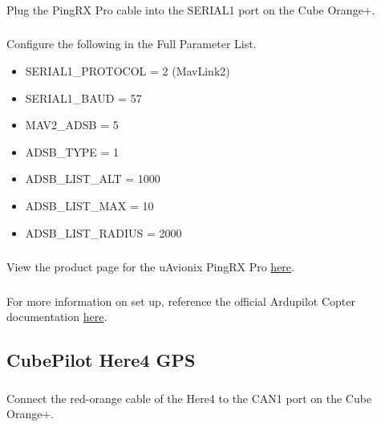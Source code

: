             \subsubsection{} Plug the PingRX Pro cable into the SERIAL1 port on the Cube Orange+.
            \subsubsection{} Configure the following in the Full Parameter List.
                \begin{itemize}
                    \item SERIAL1\_PROTOCOL = 2 (MavLink2)
                    \item SERIAL1\_BAUD = 57
                    \item MAV2\_ADSB = 5
                    \item ADSB\_TYPE = 1
                    \item ADSB\_LIST\_ALT = 1000
                    \item ADSB\_LIST\_MAX = 10
                    \item ADSB\_LIST\_RADIUS = 2000
                 \end{itemize}           
            \subsubsection{} View the product page for the uAvionix PingRX Pro
            \textcolor{blue}{\href{https://uavionix.com/uncrewed-aircraft-systems/pingrx-pro/?srsltid=AfmBOooqlrmsQ8bbImx3x5luUUu8aQBeiHQzcjQTfeGQW_IhnDc-3P5R\#documentation}{here}}.
            \subsubsection{} For more information on set up, reference the official Ardupilot Copter documentation \textcolor{blue}{\href{https://ardupilot.org/copter/docs/common-ads-b-receiver.html}{here}}.

        \subsection{CubePilot Here4 GPS}
            
            \subsubsection{} Connect the red-orange cable of the Here4 to the CAN1 port on the Cube Orange+.
